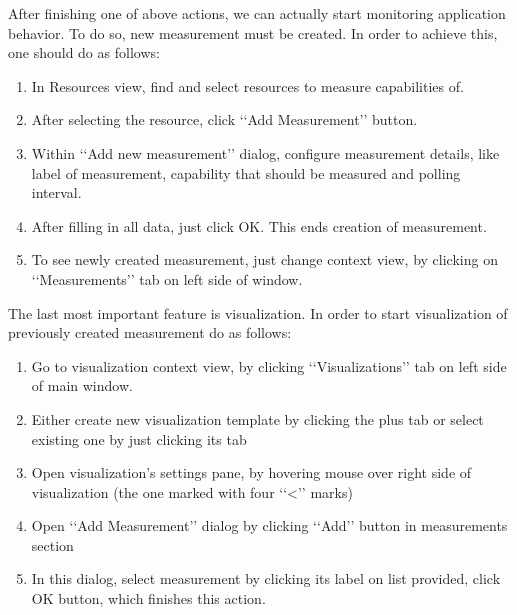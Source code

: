 After finishing one of above actions, we can actually start monitoring application behavior. To do so, new measurement must be created. In order to achieve this, one should do as follows:

\begin{enumerate}

\item In Resources view, find and select resources to measure capabilities of.

\item After selecting the resource, click \lq\lq{}Add Measurement\rq\rq{} button.

\item Within \lq\lq{}Add new measurement\rq\rq{} dialog, configure measurement details, like label of measurement, capability that should be measured and polling interval.

\item After filling in all data, just click OK. This ends creation of measurement. 

\item To see newly created measurement, just change context view, by clicking on \lq\lq{}Measurements\rq\rq{} tab on left side of window.

\end{enumerate}

The last most important feature is visualization. In order to start visualization of previously created measurement do as follows:

\begin{enumerate}

\item Go to visualization context view, by clicking \lq\lq{}Visualizations\rq\rq{} tab on left side of main window.

\item Either create new visualization template by clicking the plus tab or select existing one by just clicking its tab

\item Open visualization\rq{}s settings pane, by hovering mouse over right side of visualization (the one marked with four \lq\lq{}<\rq\rq{} marks)

\item Open \lq\lq{}Add Measurement\rq\rq{} dialog by clicking \lq\lq{}Add\rq\rq{} button in measurements section

\item In this dialog, select measurement by clicking its label on list provided, click OK button, which finishes this action.

\end{enumerate}
